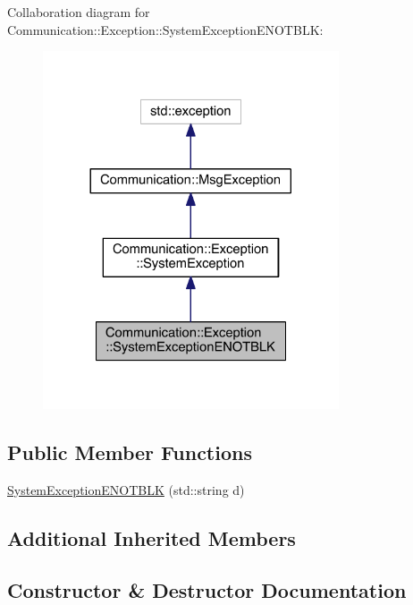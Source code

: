 Collaboration diagram for Communication\+:\+:Exception\+:\+:System\+Exception\+E\+N\+O\+T\+B\+L\+K\+:\nopagebreak
\begin{figure}[H]
\begin{center}
\leavevmode
\includegraphics[width=248pt]{class_communication_1_1_exception_1_1_system_exception_e_n_o_t_b_l_k__coll__graph}
\end{center}
\end{figure}
\subsection*{Public Member Functions}
\begin{DoxyCompactItemize}
\item 
\hyperlink{class_communication_1_1_exception_1_1_system_exception_e_n_o_t_b_l_k_a9b2d3057636de094c85396413709e6ba}{System\+Exception\+E\+N\+O\+T\+B\+L\+K} (std\+::string d)
\end{DoxyCompactItemize}
\subsection*{Additional Inherited Members}


\subsection{Constructor \& Destructor Documentation}
\hypertarget{class_communication_1_1_exception_1_1_system_exception_e_n_o_t_b_l_k_a9b2d3057636de094c85396413709e6ba}{}
